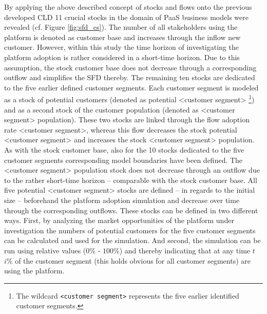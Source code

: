 By applying the above described concept of stocks and flows onto the previous developed \ac{CLD} 11 crucial stocks in the domain of \ac{PaaS} business models were revealed (cf. Figure \ref{fig:sfd_cs}). The number of all stakeholders using the platform is denoted as customer base and increases through the inflow new customer. However, within this study the time horizon of investigating the platform adoption is rather considered in a short-time horizon. Due to this assumption, the stock customer base does not decrease through a corresponding outflow and simplifies the \ac{SFD} thereby. The remaining ten stocks are dedicated to the five earlier defined customer segments. Each customer segment is modeled as a stock of potential customers (denoted as potential <customer segment> \footnote{The wildcard \texttt{<customer segment>} represents the five earlier identified customer segments.}) and as a second stock of the customer population (denoted as <customer segment> population). These two stocks are linked through the flow adoption rate <customer segment>, whereas this flow decreases the stock potential <customer segment> and increases the stock <customer segment> population. As with the stock customer base, also for the 10 stocks dedicated to the five customer segments corresponding model boundaries have been defined. The <customer segment> population stock does not decrease through an outflow due to the rather short-time horizon -- comparable with the stock customer base. All five potential <customer segment> stocks are defined -- in regards to the initial size -- beforehand the platform adoption simulation and decrease over time through the corresponding outflows. These stocks can be defined in two different ways. First, by analyzing the market opportunities of the platform under investigation the numbers of potential customers for the five customer segments can be calculated and used for the simulation. And second, the simulation can be run using relative values ($0\%$ - $100\%$) and thereby indicating that at any time $t$ $i\%$ of the customer segment (this holds obvious for all customer segments) are using the platform.

